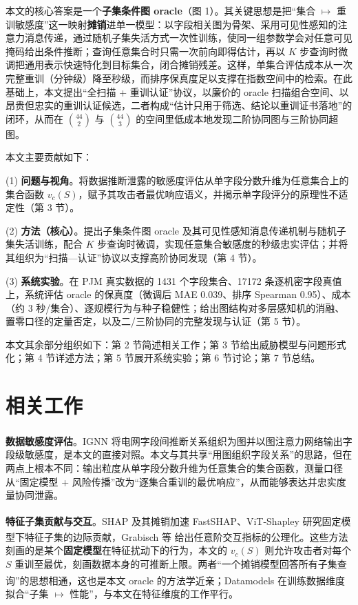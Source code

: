\documentclass[10.5pt,compsoc,UTF8]{CjC}
\theoremstyle{mystyle}
\newcommand{\upcite}[1]{\textsuperscript{\cite{#1}}}
\begin{document}
本文的核心答案是一个\textbf{子集条件图 oracle}（图 1）。其关键思想是把“集合 $\mapsto$ 重训敏感度”这一映射\textbf{摊销}进单一模型：以字段相关图为骨架、采用可见性感知的注意力消息传递，通过随机子集失活方式一次性训练，使同一组参数学会对任意可见掩码给出条件推断；查询任意集合时只需一次前向即得估计，再以 $K$ 步查询时微调把通用表示快速特化到目标集合，闭合摊销残差。这样，单集合评估成本从一次完整重训（分钟级）降至秒级，而排序保真度足以支撑在指数空间中的检索。在此基础上，本文提出“全扫描 + 重训认证”协议，以廉价的 oracle 扫描组合空间、以昂贵但忠实的重训认证候选，二者构成“估计只用于筛选、结论以重训证书落地”的闭环，从而在 $\binom{44}{2}$ 与 $\binom{44}{3}$ 的空间里低成本地发现二阶协同图与三阶协同超图。

本文主要贡献如下：

(1) \textbf{问题与视角}。将数据推断泄露的敏感度评估从单字段分数升维为任意集合上的集合函数 $v_c(S)$，赋予其攻击者最优响应语义，并揭示单字段评分的原理性不适定性（第 3 节）。

(2) \textbf{方法（核心）}。提出子集条件图 oracle 及其可见性感知消息传递机制与随机子集失活训练，配合 $K$ 步查询时微调，实现任意集合敏感度的秒级忠实评估；并将其组织为“扫描—认证”协议以支撑高阶协同发现（第 4 节）。

(3) \textbf{系统实验}。在 PJM 真实数据的 1431 个字段集合、17172 条逐机密字段真值上，系统评估 oracle 的保真度（微调后 MAE 0.039、排序 Spearman 0.95）、成本（约 3 秒/集合）、逐规模行为与种子稳健性；给出图结构对多层感知机的消融、置零口径的定量否定，以及二/三阶协同的完整发现与认证（第 5 节）。

本文其余部分组织如下：第 2 节简述相关工作；第 3 节给出威胁模型与问题形式化；第 4 节详述方法；第 5 节展开系统实验；第 6 节讨论；第 7 节总结。

\section{\heiti 相关工作}

\textbf{数据敏感度评估}。IGNN\upcite{hu2026ignn} 将电网字段间推断关系组织为图并以图注意力网络输出字段级敏感度，是本文的直接对照。本文与其共享“用图组织字段关系”的思路，但在两点上根本不同：输出粒度从单字段分数升维为任意集合的集合函数，测量口径从“固定模型 + 风险传播”改为“逐集合重训的最优响应”，从而能够表达并忠实度量协同泄露。

\textbf{特征子集贡献与交互}。SHAP\upcite{lundberg2017shap} 及其摊销加速 FastSHAP\upcite{jethani2022fastshap}、ViT-Shapley\upcite{covert2023vitshapley} 研究固定模型下特征子集的边际贡献，Grabisch 等\upcite{grabisch1999interaction} 给出任意阶交互指标的公理化。这些方法刻画的是某个\textbf{固定模型}在特征扰动下的行为，本文的 $v_c(S)$ 则允许攻击者对每个 $S$ 重训至最优，刻画数据本身的可推断上限。两者“一个摊销模型回答所有子集查询”的思想相通，这也是本文 oracle 的方法学近亲；Datamodels\upcite{ilyas2022datamodels} 在训练数据维度拟合“子集 $\mapsto$ 性能”，与本文在特征维度的工作平行。
\end{document}
